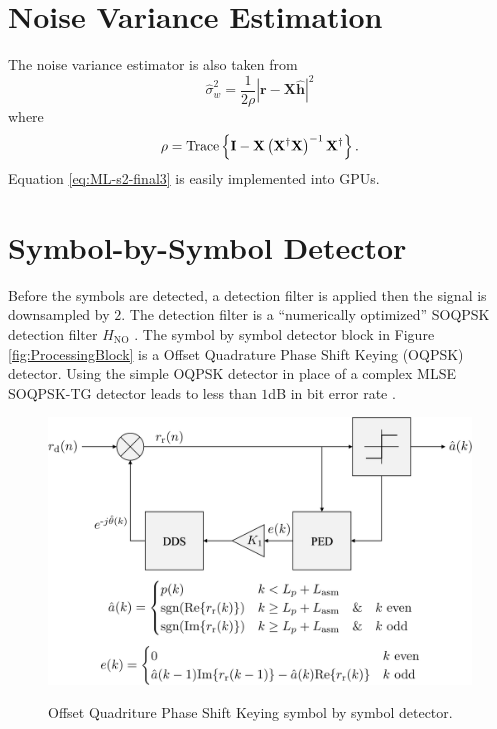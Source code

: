 \section{Noise Variance Estimation}
\label{sec:noise_variance_estimation}
The noise variance estimator is also taken from \cite[eq. 9]{rice-afran-saquib-cole-rhodes-moazzami:2014}
\begin{equation}
	\hat{\sigma}_w^2 = \frac{1}{2\rho} \left| \mathbf{r}-\mathbf{X}\hat{\mathbf{h}}\right|^2
	\label{eq:ML-s2-final3}
\end{equation}
where
\begin{equation}
	\rho = {\rm Trace} \left\{ \mathbf{I} -  \mathbf{X}\left(\mathbf{X}^\dag\mathbf{X}\right)^{-1}\mathbf{X}^\dag \right\}.
\end{equation}
Equation \eqref{eq:ML-s2-final3} is easily implemented into GPUs.


\section{Symbol-by-Symbol Detector}
\label{sec:oqpsk_detector}
Before the symbols are detected, a detection filter is applied then the signal is downsampled by $2$. 
The detection filter is a ``numerically optimized'' SOQPSK detection filter $H_\text{NO}$ \cite[Fig. 3]{perrins:2013}.
The symbol by symbol detector block in Figure \ref{fig:ProcessingBlock} is a Offset Quadrature Phase Shift Keying (OQPSK) detector.
Using the simple OQPSK detector in place of a complex MLSE SOQPSK-TG detector leads to less than $1$dB in bit error rate \cite{perrins:2013}.
\begin{figure}
	\caption{Offset Quadriture Phase Shift Keying symbol by symbol detector.}
	\centering\includegraphics[width=6in]{figures/systemOverview/OQPSK.pdf}
	\label{fig:OQPSK}
\end{figure}

